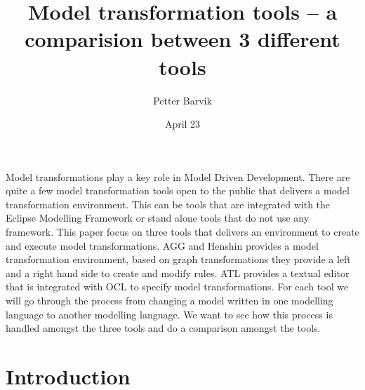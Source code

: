 \documentclass[pdftex,11pt,a4paper]{article}
\begin{document}
\title{Model transformation tools -- a comparision between 3 different tools}
\date{April 23}
\author{Petter Barvik}

\maketitle

\abstract{}
\noindent Model transformations play a key role in Model Driven Development.
There are quite a few model transformation tools open to the public that
delivers a model transformation environment. This can be tools that are
integrated with the Eclipse Modelling Framework or stand alone tools that do not
use any framework. This paper focus on three tools that delivers an environment to
create and execute model transformations. AGG and Henshin provides a model
transformation environment, based on graph transformations they provide a left
and a right hand side to create and modify rules. ATL provides a textual editor
that is integrated with OCL to specify model transformations. For each tool we
will go through the process from changing a model written in one modelling
language to another modelling language. We want to see how this process is
handled amongst the three tools and do a comparison amongst the tools.

\newpage
\section{Introduction}
\end{document}
